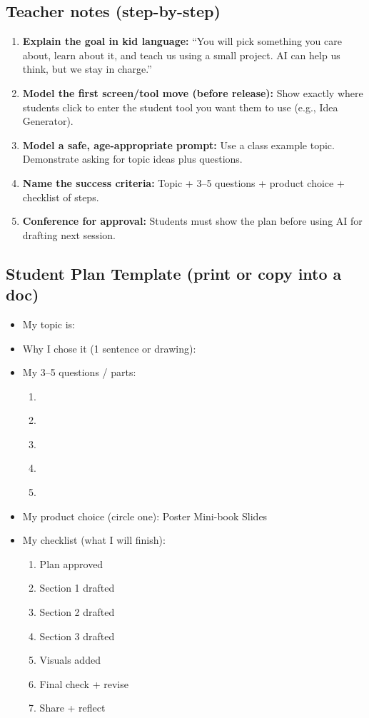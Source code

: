 \documentclass[11pt]{article}
\newcommand{\Sub}[1]{\subsection*{#1}}
\begin{document}
\Sub{Teacher notes (step-by-step)}
\begin{enumerate}[leftmargin=*]
  \item \textbf{Explain the goal in kid language:}
  ``You will pick something you care about, learn about it, and teach us using a small project. AI can help us think, but we stay in charge.''
  \item \textbf{Model the first screen/tool move (before release):}
  Show exactly where students click to enter the student tool you want them to use (e.g., Idea Generator).
  \item \textbf{Model a safe, age-appropriate prompt:}
  Use a class example topic. Demonstrate asking for topic ideas plus questions.
  \item \textbf{Name the success criteria:}
  Topic + 3--5 questions + product choice + checklist of steps.
  \item \textbf{Conference for approval:}
  Students must show the plan before using AI for drafting next session.
\end{enumerate}

\Sub{Student Plan Template (print or copy into a doc)}
\begin{itemize}[leftmargin=*]
  \item My topic is: \underline{\hspace{10cm}}
  \item Why I chose it (1 sentence or drawing): \underline{\hspace{10cm}}
  \item My 3--5 questions / parts:
    \begin{enumerate}
      \item \underline{\hspace{9cm}}
      \item \underline{\hspace{9cm}}
      \item \underline{\hspace{9cm}}
      \item \underline{\hspace{9cm}}
      \item \underline{\hspace{9cm}}
    \end{enumerate}
  \item My product choice (circle one): Poster \quad Mini-book \quad Slides
  \item My checklist (what I will finish):
    \begin{enumerate}
      \item Plan approved
      \item Section 1 drafted
      \item Section 2 drafted
      \item Section 3 drafted
      \item Visuals added
      \item Final check + revise
      \item Share + reflect
    \end{enumerate}
\end{itemize}
\end{document}
